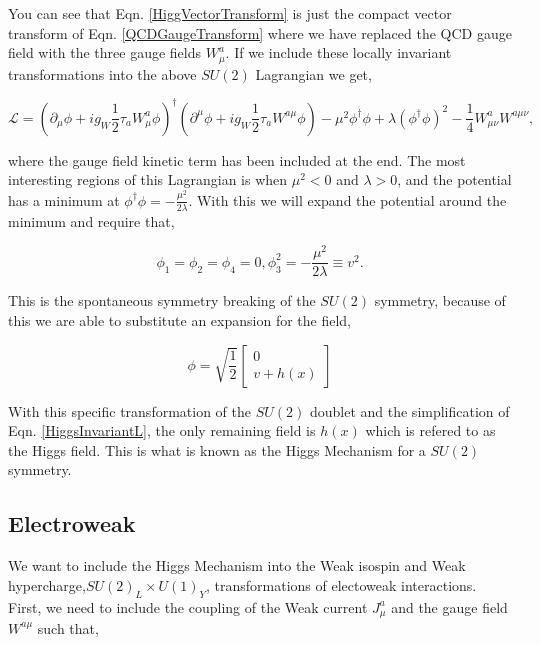 You can see that Eqn. \ref{HiggVectorTransform} is just the compact vector transform of Eqn. \ref{QCDGaugeTransform} where we have replaced the QCD gauge field with the three gauge fields $W_\mu^a$. If we include these locally invariant transformations into the above $SU(2)$ Lagrangian we get,

\begin{equation}\label{HiggsInvariantL}
\mathcal{L}=(\partial_\mu\phi+ig_W\frac{1}{2}\tau_{a}W^{a}_\mu\phi)^\dagger(\partial^\mu\phi+ig_W\frac{1}{2}\tau_{a}W^{a\mu}\phi)-\mu^2\phi^\dagger\phi+\lambda(\phi^\dagger\phi)^2-\frac{1}{4}W^{a}_{\mu\nu}W^{a\mu\nu},
\end{equation}

where the gauge field kinetic term has been included at the end. The most interesting regions of this Lagrangian is when $\mu^2<0$ and $\lambda>0$, and the potential has a minimum at $\phi^\dagger\phi=-\frac{\mu^2}{2\lambda}$. With this we will expand the potential around the minimum and require that,

\begin{equation}
\phi_1=\phi_2=\phi_4=0, \phi_3^2=-\frac{\mu^2}{2\lambda}\equiv v^2.
\end{equation}

This is the spontaneous symmetry breaking of the $SU(2)$ symmetry, because of this we are able to substitute an expansion for the field,

\begin{equation}
\phi=\sqrt{\frac{1}{2}}
\begin{bmatrix}
0 \\
v+h(x)
\end{bmatrix}
\end{equation}

With this specific transformation of the $SU(2)$ doublet and the simplification of Eqn. \ref{HiggsInvariantL}, the only remaining field is $h(x)$ which is refered to as the Higgs field. This is what is known as the Higgs Mechanism for a $SU(2)$ symmetry. 

\subsection{Electroweak} \label{EMWeak}

We want to include the Higgs Mechanism into the Weak isospin and Weak hypercharge,$SU(2)_L\times U(1)_Y$, transformations of electoweak interactions. First, we need to include the coupling of the Weak current $J^a_\mu$ and the gauge field $W^{a\mu}$ such that,

